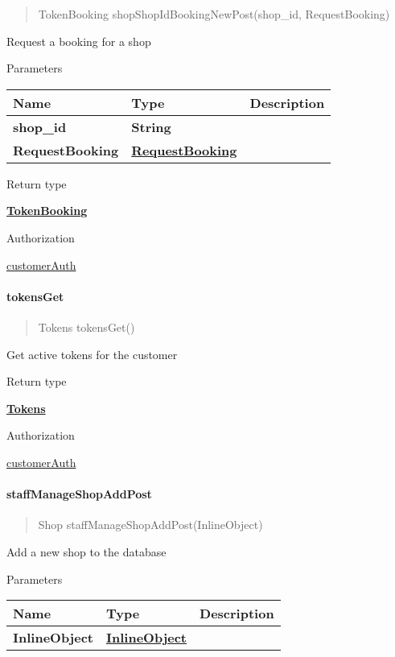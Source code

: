 \begin{quote}
TokenBooking shopShopIdBookingNewPost(shop\_id, RequestBooking)
\end{quote}

Request a booking for a shop

Parameters

\begin{longtable}[]{@{}lll@{}}
\toprule
Name & Type & Description\tabularnewline
\midrule
\endhead
\textbf{shop\_id} & \textbf{String} &\tabularnewline
\textbf{RequestBooking} &
\href{../Models/RequestBooking.md}{\textbf{RequestBooking}}
&\tabularnewline
\bottomrule
\end{longtable}

Return type

\href{../Models/TokenBooking.md}{\textbf{TokenBooking}}

Authorization

\href{../README.md\#customerAuth}{customerAuth}

\hypertarget{tokensget}{%
\paragraph{\texorpdfstring{\textbf{tokensGet}}{tokensGet}}\label{tokensget}}

\begin{quote}
Tokens tokensGet()
\end{quote}

Get active tokens for the customer

Return type

\href{../Models/Tokens.md}{\textbf{Tokens}}

Authorization

\href{../README.md\#customerAuth}{customerAuth}

\hypertarget{staffmanageshopaddpost}{%
\paragraph{\texorpdfstring{\textbf{staffManageShopAddPost}}{staffManageShopAddPost}}\label{staffmanageshopaddpost}}

\begin{quote}
Shop staffManageShopAddPost(InlineObject)
\end{quote}

Add a new shop to the database

Parameters

\begin{longtable}[]{@{}lll@{}}
\toprule
Name & Type & Description\tabularnewline
\midrule
\endhead
\textbf{InlineObject} &
\href{../Models/InlineObject.md}{\textbf{InlineObject}} &\tabularnewline
\bottomrule
\end{longtable}

